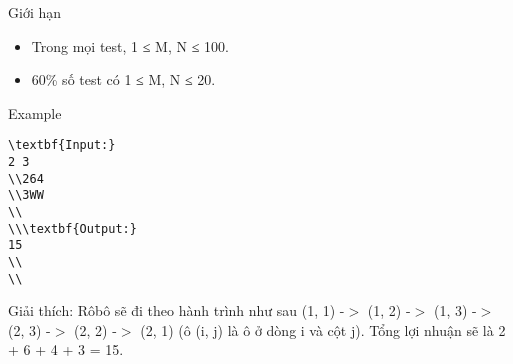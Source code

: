 Giới hạn
\begin{itemize}
	\item     Trong mọi test, 1 ≤ M, N ≤ 100.   
	\item     60\% số test có 1 ≤ M, N ≤ 20.   
\end{itemize}
Example
\begin{verbatim}
\textbf{Input:}
2 3
\\264
\\3WW
\\
\\\textbf{Output:}
15
\\
\\\end{verbatim}

Giải thích: Rôbô sẽ đi theo hành trình như sau (1, 1) -$>$ (1, 2) -$>$ (1, 3) -$>$ (2, 3) -$>$ (2, 2) -$>$ (2, 1) (ô (i, j) là ô ở dòng i và cột j). Tổng lợi nhuận sẽ là 2 + 6 + 4 + 3 = 15.
